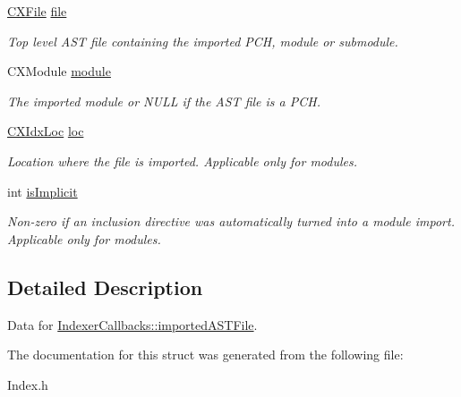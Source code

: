 \begin{DoxyCompactItemize}
\item 
\mbox{\label{structCXIdxImportedASTFileInfo_a27dad72f207ae72a8b311214c21949cb}} 
\hyperlink{group__CINDEX__FILES_gacfcea9c1239c916597e2e5b3e109215a}{C\+X\+File} \hyperlink{structCXIdxImportedASTFileInfo_a27dad72f207ae72a8b311214c21949cb}{file}
\begin{DoxyCompactList}\small\item\em Top level A\+ST file containing the imported P\+CH, module or submodule. \end{DoxyCompactList}\item 
\mbox{\label{structCXIdxImportedASTFileInfo_add8154ffb15b3a72dcee20de324cdb64}} 
C\+X\+Module \hyperlink{structCXIdxImportedASTFileInfo_add8154ffb15b3a72dcee20de324cdb64}{module}
\begin{DoxyCompactList}\small\item\em The imported module or N\+U\+LL if the A\+ST file is a P\+CH. \end{DoxyCompactList}\item 
\mbox{\label{structCXIdxImportedASTFileInfo_a1be0a497d769a719f6008b2558181dbe}} 
\hyperlink{structCXIdxLoc}{C\+X\+Idx\+Loc} \hyperlink{structCXIdxImportedASTFileInfo_a1be0a497d769a719f6008b2558181dbe}{loc}
\begin{DoxyCompactList}\small\item\em Location where the file is imported. Applicable only for modules. \end{DoxyCompactList}\item 
\mbox{\label{structCXIdxImportedASTFileInfo_a307ecc7457bd9d3d28339fa781c8345e}} 
int \hyperlink{structCXIdxImportedASTFileInfo_a307ecc7457bd9d3d28339fa781c8345e}{is\+Implicit}
\begin{DoxyCompactList}\small\item\em Non-\/zero if an inclusion directive was automatically turned into a module import. Applicable only for modules. \end{DoxyCompactList}\end{DoxyCompactItemize}


\subsection{Detailed Description}
Data for \hyperlink{structIndexerCallbacks_a75672a9934f69854080bee3fbc0e3994}{Indexer\+Callbacks\+::imported\+A\+S\+T\+File}. 

The documentation for this struct was generated from the following file\+:\begin{DoxyCompactItemize}
\item 
Index.\+h\end{DoxyCompactItemize}
